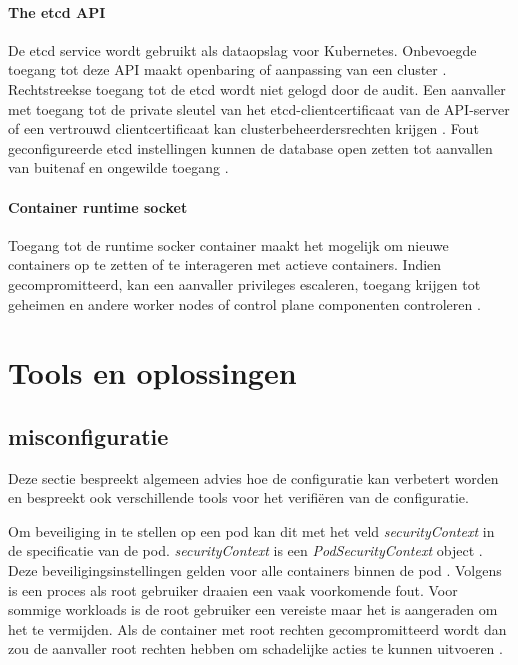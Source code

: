 \paragraph{The etcd API}
De etcd service wordt gebruikt als dataopslag voor Kubernetes. Onbevoegde toegang tot deze API maakt openbaring of aanpassing van een cluster \autocite{KubernetesDocs-2023}. Rechtstreekse toegang tot de etcd wordt niet gelogd door de audit.
Een aanvaller met toegang tot de private sleutel van het etcd-clientcertificaat van de API-server of een vertrouwd clientcertificaat kan clusterbeheerdersrechten krijgen \autocite{KubernetesDocs-2023}. Fout geconfigureerde etcd instellingen kunnen de database open zetten tot aanvallen van buitenaf en ongewilde toegang \autocite{KubernetesDocs-2023}.

\paragraph{Container runtime socket}
Toegang tot de runtime socker container maakt het mogelijk om nieuwe containers op te zetten of te interageren met actieve containers. Indien gecompromitteerd, kan een aanvaller privileges escaleren, toegang krijgen tot geheimen en andere worker nodes of control plane componenten controleren \autocite{KubernetesDocs-2023}.

\section{Tools en oplossingen}

\subsection{misconfiguratie}
Deze sectie bespreekt algemeen advies hoe de configuratie kan verbetert worden en bespreekt ook verschillende tools voor het verifiëren van de configuratie.\newline

Om beveiliging in te stellen op een pod kan dit met het veld \textit{securityContext} in de specificatie van de pod. \textit{securityContext} is een \textit{PodSecurityContext} object \autocite{KubernetesDocs-2023}. 
Deze beveiligingsinstellingen gelden voor alle containers binnen de pod \autocite{KubernetesDocs-2023}. 
Volgens \textcite{OWASP-2023} is een proces als root gebruiker draaien een vaak voorkomende fout. Voor sommige workloads is de root gebruiker een vereiste maar het is aangeraden om het te vermijden. Als de container met root rechten gecompromitteerd wordt dan zou de aanvaller root rechten hebben om schadelijke acties te kunnen uitvoeren \autocite{OWASP-2023}.  \newline

